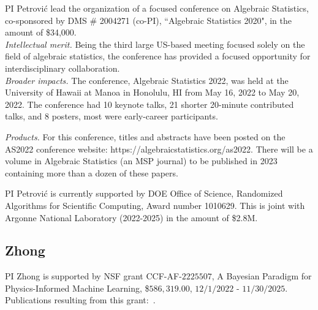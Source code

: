 \documentclass[11pt]{NSFamsart}
\begin{document}
{PI Petrovi\'c  lead the organization of a focused 
 conference on Algebraic Statistics, co-sponsored by DMS \# 2004271 (co-PI), ``Algebraic Statistics 2020", in the amount of  \$34,000. 
\\
\emph{Intellectual merit.} Being the third large US-based meeting focused solely on the field of algebraic statistics,  the conference has provided a focused opportunity for interdisciplinary collaboration. 
\\
\emph{Broader impacts.} 
The conference, Algebraic Statistics 2022, was held at the University of Hawaii at Manoa in Honolulu, HI from May 16, 2022 to May 20, 2022. The conference had 10 keynote talks, 21 shorter 20-minute contributed talks, and 8 posters, most were early-career participants. %

\noindent 
\emph{Products.} For this conference, titles and abstracts have been posted on the  AS2022 conference website: https://algebraicstatistics.org/as2022.
There will be a volume in Algebraic Statistics (an MSP journal) to be published in 2023 containing  more than a dozen of these papers. 

PI Petrovi\'c is currently supported by DOE Office of Science, Randomized Algorithms for Scientific Computing, Award number 1010629. This is joint with Argonne National Laboratory (2022-2025) in the amount of \$2.8M.

\subsection*{Zhong} PI Zhong is supported by NSF grant CCF-AF-$2225507$, A Bayesian Paradigm for Physics-Informed Machine Learning, \$$586,319.00$, $12/1/2022$ - $11/30/2025$.  Publications resulting from this grant:~\cite{chen2022using, coutinho2022physicsinformed, ZLABN2023}.

}
\end{document}
